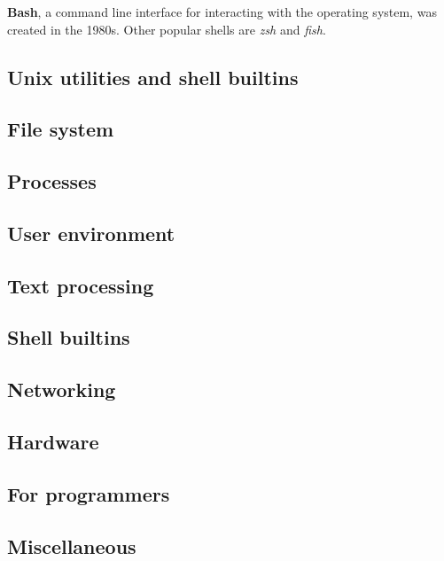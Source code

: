 \documentclass{programmingnotes}
\begin{document}
\renewcommand{\footrulewidth}{0.4pt}

\begin{multicols*}{3}
\textbf{Bash}, a command line interface for interacting with the operating system, was created in the 1980s.
Other popular shells are \emph{zsh} and \emph{fish}.





\end{multicols*}

\newpage

\begin{multicols*}{3}
\section{Unix utilities and shell builtins}
\subsection{File system} 
\subsection{Processes} 
\subsection{User environment} 
\subsection{Text processing} 
\subsection{Shell builtins} 
\subsection{Networking} 
\subsection{Hardware} 
\subsection{For programmers} 
\subsection{Miscellaneous} 
\end{multicols*}
\end{document}
